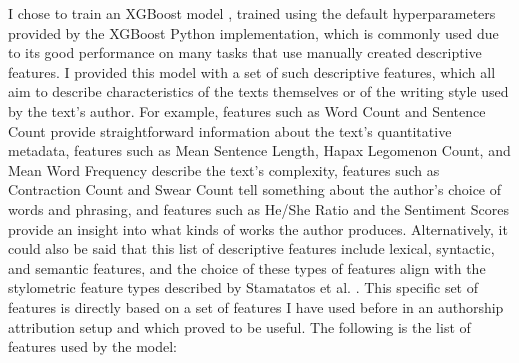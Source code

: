 \documentclass{article}
\begin{document}
I chose to train an XGBoost model \cite{chen2016xgboost}, trained using the default hyperparameters provided by the XGBoost Python implementation, which is commonly used due to its good performance on many tasks that use manually created descriptive features.
I provided this model with a set of such descriptive features, which all aim to describe characteristics of the texts themselves or of the writing style used by the text's author.
For example, features such as Word Count and Sentence Count provide straightforward information about the text's quantitative metadata, features such as Mean Sentence Length, Hapax Legomenon Count, and Mean Word Frequency describe the text's complexity, features such as Contraction Count and Swear Count tell something about the author's choice of words and phrasing, and features such as He/She Ratio and the Sentiment Scores provide an insight into what kinds of works the author produces.
Alternatively, it could also be said that this list of descriptive features include lexical, syntactic, and semantic features, and the choice of these types of features align with the stylometric feature types described by Stamatatos et al. \cite{stamatatos2009surveymodern,stamatatos2016authorshipverification}. 
This specific set of features is directly based on a set of features I have used before in an authorship attribution setup and which proved to be useful.
The following is the list of features used by the model:
\end{document}
